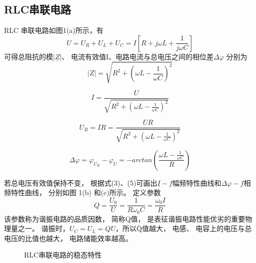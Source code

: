 \documentclass[10pt,a4paper,twocolumn,twoside,UTF8]{ctexart}
\begin{document}
    \subsection{RLC串联电路}
    RLC 串联电路如图1(a)所示，有
	\begin{equation}
		U=U_R+U_L+U_C=I[R+j \omega L+\frac{1}{j\omega C}]
	\end{equation}
    可得总阻抗的模$|ܼZ|$、 电流有效值I、电路电流与总电压之间的相位差$\varDelta \varphi$ 分别为
    \begin{equation}
		|Z|=\sqrt{R^2+\left(\omega L-\frac{1}{\omega C}\right)^2}
	\end{equation}

    \begin{equation}
		I=\frac{U}{\sqrt{R^2+\left(\omega L-\frac{1}{\omega C}\right)^2}}
	\end{equation}

	\begin{equation}
		U_R=IR=\frac{UR}{\sqrt{R^2+\left(\omega L-\frac{1}{\omega C}\right)^2}}
	\end{equation}

	\begin{equation}
		\varDelta \varphi=\varphi_{U_R}-\varphi_U=-arctan\left(\frac{\omega L-\frac{1}{\omega C}}{R}\right)
	\end{equation}

    若总电压有效值ܷ保持不变， 根据式(3)、(5)可画出݂$I-f$幅频特性曲线和$\varDelta\varphi- f$相频特性曲线， 分别如图 1(b) 和(c)所示。
    定义参数
    \begin{equation}
		Q=\frac{U_0}{U}=\frac{1}{R\omega_0 C}=\frac{\omega_0 I}{R}
	\end{equation}
    该参数称为谐振电路的品质因数， 简称Qܳ值， 是表征谐振电路性能优劣的重要物理量之一。
	谐振时，$U_C=U_L=QU$，所以ܳQ值越大， 电感、 电容上的电压与总电压的比值也越大， 电路储能效率越高。

	\begin{figure}[htbp]
		\centering
		\caption{RLC串联电路的稳态特性}
		\label{fig:RLC}
	\end{figure}
\end{document}
